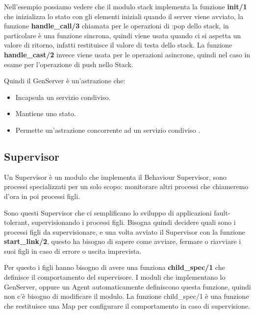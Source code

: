 Nell'esempio possiamo vedere che il modulo stack implementa
la funzione \textbf{init/1} che inizializza lo stato con gli elementi
iniziali quando il server viene avviato, la funzione \textbf{handle\_call/3}
chiamata per le operazioni di :pop dello stack, in particolare
è una funzione sincrona, quindi viene usata quando ci si aspetta
un valore di ritorno, infatti restituisce il valore di
testa dello stack. La funzione \textbf{handle\_cast/2} invece viene usata per
le operazioni asincrone, quindi nel caso in esame per l'operazione di
push nello Stack.

Quindi il GenServer è un'astrazione che:

\begin{itemize}
	\item Incapsula un servizio condiviso.
	\item Mantiene uno stato.
	\item Permette un'astrazione concorrente ad un servizio condiviso \cite{adoptingElixirchap5pag96}.
\end{itemize}


\subsection{Supervisor}

Un Supervisor è un modulo che implementa il Behaviour Supervisor,
sono processi specializzati per un solo scopo: monitorare altri processi
che chiameremo d'ora in poi processi figli.

Sono questi Supervisor che ci semplificano lo sviluppo di applicazioni
fault-tolerant, supervisionando i processi figli.
Bisogna quindi decidere quali sono i processi figli da supervisionare,
e una volta avviato il Supervisor con la funzione \textbf{start\_link/2},
questo ha bisogno di sapere come avviare, fermare o riavviare i suoi figli
in caso di errore o uscita imprevista.

Per questo i figli hanno bisogno di avere una funziona \textbf{child\_spec/1}
che definisce il comportamento del supervisore. I moduli che implementano
lo GenServer, oppure un Agent automaticamente definiscono questa funzione,
quindi non c'è bisogno di modificare il modulo.
La funzione child\_spec/1 è una funzione che restituisce una Map per
configurare il comportamento in caso di supervisione.



